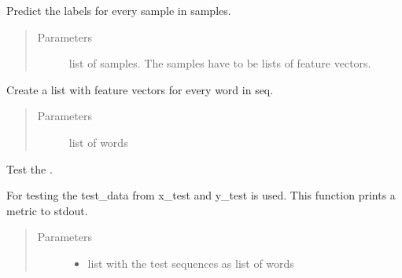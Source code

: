 \documentclass[letterpaper,10pt,english]{sphinxmanual}
\begin{document}
\begin{fulllineitems}
\begin{fulllineitems}
\begin{quote}
\begin{description}
\end{description}\end{quote}

\end{fulllineitems}


\begin{fulllineitems}
\label{\detokenize{api:impressum_crf.ImpressumCRF.predict}}
Predict the labels for every sample in samples.
\begin{quote}\begin{description}
\item[{Parameters}] \leavevmode
{} \textendash{} list of samples. The samples have to be lists of
feature vectors.

\end{description}\end{quote}

\end{fulllineitems}


\begin{fulllineitems}
\label{\detokenize{api:impressum_crf.ImpressumCRF.seq2feat}}
Create a list with feature vectors for every word in seq.
\begin{quote}\begin{description}
\item[{Parameters}] \leavevmode
{} \textendash{} list of words

\end{description}\end{quote}

\end{fulllineitems}


\begin{fulllineitems}
\label{\detokenize{api:impressum_crf.ImpressumCRF.test}}
Test the .

For testing the test\_data from x\_test and y\_test is used. This
function prints a metric to stdout.
\begin{quote}\begin{description}
\item[{Parameters}] \leavevmode\begin{itemize}
\item {} 
 \textendash{} list with the test sequences as list of words


\end{itemize}
\end{description}
\end{quote}
\end{fulllineitems}
\end{fulllineitems}
\end{document}
